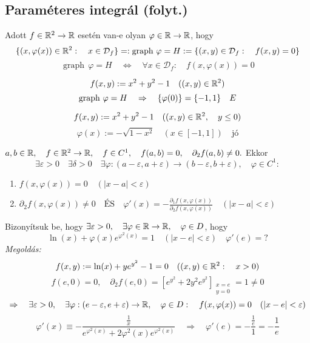\documentclass[a4paper,11.5pt]{article}
\DeclareMathOperator{\Graph}{graph}
\begin{document}
	\subsection{Paraméteres integrál (folyt.)}
	\begin{note}
		Adott $f\in\mathbb{R}^2\to\mathbb{R}$ esetén van-e olyan $\varphi\in\mathbb{R}\to\mathbb{R}$, hogy
		\[ \{ (x,\varphi(x))\in\R^2:\quad x\in\mathcal{D}_f \}=:\Graph\,\varphi=H:=\{ (x,y)\in\mathcal{D}_f:\quad f(x,y)=0 \} \]
		\[ \Graph\,\varphi=H\quad \Leftrightarrow\quad \forall x\in\mathcal{D}_f:\quad f(x,\varphi(x))=0 \]
	\end{note}
	\begin{example}
		\[ f(x,y):=x^2+y^2-1 \quad ((x,y)\in\mathbb{R}^2)\]
		\[ \Graph\,\varphi=H\quad \Rightarrow\quad \{ \varphi(0) \}=\{-1,1\}\quad \Lightning \]
	\end{example}
	\begin{example}
		\[ f(x,y):=x^2+y^2-1\quad ((x,y)\in\mathbb{R}^2,\quad y\leq 0) \]
		\[ \varphi(x):=-\sqrt{1-x^2}\quad (x\in[-1,1])\quad \text{jó} \]
	\end{example}
	\begin{theorem}
		$a,b\in\mathbb{R},\quad f\in\mathbb{R}^2\to\mathbb{R},\quad f\in C^1,\quad f(a,b)=0,\quad \partial_2f(a,b)\not=0.$ Ekkor
		\[ \exists \varepsilon>0\quad \exists\delta>0\quad \exists\varphi:(a-\varepsilon,a+\varepsilon)\to(b-\varepsilon,b+\varepsilon),\quad \varphi\in C^1: \]
		\begin{enumerate}
			\item 
			$ f(x,\varphi(x))=0\quad (|x-a|<\varepsilon) $
			\item $\partial_2f(x,\varphi(x))\not=0\quad \text{ÉS} \quad \varphi'(x)= -\frac{\partial_1f(x,\varphi(x))}{\partial_2f(x,\varphi(x))}\quad (|x-a|<\varepsilon)$
		\end{enumerate}
	\end{theorem}
	\begin{task}
		Bizonyítsuk be, hogy $\exists\varepsilon>0,\quad \exists\varphi\in\mathbb{R}\to\mathbb{R},\quad \varphi\in D$, hogy
		\[\ln(x)+\varphi(x)e^{\varphi^2(x)}=1\quad (|x-e|<\varepsilon)\quad \varphi'(e)=?\]
		\textit{Megoldás:}
		\[ f(x,y):=\ln(x)+ye^{y^2}-1=0\quad ((x,y)\in\mathbb{R}^2:\quad x>0) \]
		\[ f(e,0)=0,\quad \partial_2f(e,0)=\left[e^{y^2}+2y^2e^{y^2}\right]_{\substack{x=e\\y=0}}=1\not=0 \]
		\[ \Rightarrow\quad \exists\varepsilon>0,\quad \exists\varphi:(e-\varepsilon,e+\varepsilon)\to\mathbb{R},\quad \varphi\in D:\quad f(x,\varphi(x))=0\quad (|x-e|<\varepsilon) \]
		\[ \varphi'(x)\equiv -\frac{\frac{1}{x}}{e^{\varphi^2(x)}+2\varphi^2(x)e^{\varphi^2(x)}}\quad \Rightarrow\quad \varphi'(e)=-\frac{\frac{1}{e}}{1}=-\frac{1}{e} \]
	\end{task}
			
\end{document}
